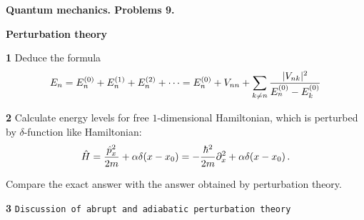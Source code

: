 \baselineskip=14pt
\def\vare {\varepsilon}
\def\A {{\bf A}}
\def\t {\tilde}
\def\a {\alpha}
\def\K {{\bf K}}
\def\N {{\bf N}}
\def\V {{\cal V}}
\def\s {{\sigma}}
\def\S {{\Sigma}}
\def\s {{\sigma}}
\def\p{\partial}
\def\vare{{\varepsilon}}
\def\Q {{\bf Q}}
\def\D {{\cal D}}
\def\G {{\Gamma}}
\def\C {{\bf C}}
\def\M {{\cal M}}
\def\Z {{\bf Z}}
\def\U  {{\cal U}}
\def\H {{\cal H}}
\def\R  {{\bf R}}
\def\S  {{\bf S}}
\def\E  {{\bf E}}
\def\l {\lambda}
\def\ll {{\bf l}}
\def\degree {{\bf {\rm degree}\,\,}}
\def \finish {${\,\,\vrule height1mm depth2mm width 8pt}$}
\def \m {\medskip}
\def\p {\partial}
\def\r {{\bf r}}
\def\pt {{\bf p}}
\def\v {{\bf v}}
\def\n {{\bf n}}
\def\t {{\bf t}}
\def\b {{\bf b}}
\def\c {{\bf c }}
\def\e{{\bf e}}
\def\ac {{\bf a}}
\def \X   {{\bf X}}
\def \Y   {{\bf Y}}
\def \x   {{\bf x}}
\def \y   {{\bf y}}
\def \z   {{\bf z}}
\def \G{{\cal G}}
\def\w {{\omega}}
\def \Tr  {{\rm Tr\,}}
\def\V {{\cal V}}
\def\H {{\cal H}}


\centerline {\bf Quantum mechanics. Problems 9.}

\centerline {\bf Perturbation theory}


{\bf 1}   Deduce the formula
                 $$
E_{n}=
 E_{n}^{(0)}+
 E_{n}^{(1)}+
 E_{n}^{(2)}+\dots=
 E_{n}^{(0)}+
                V_{nn}+
           \sum_{k\not =n}{|V_{nk}|^2\over 
          E^{(0)}_{n}-E^{(0)}_{k}}
                 $$

\m


{\bf 2}    Calculate energy levels for free $1$-dimensional Hamiltonian,
which is perturbed by $\delta$-function like Hamiltonian:
                $$
   \hat H={\hat p_x^2\over 2m}+\a \delta (x-x_0)=
      -{\hbar ^2\over 2m}\p_x^2+\a \delta (x-x_0)\,.
                   $$

Compare the exact answer with the answer obtained by perturbation theory.


\m

{\bf 3}    {\tt Discussion of abrupt and adiabatic perturbation theory}


\bye
